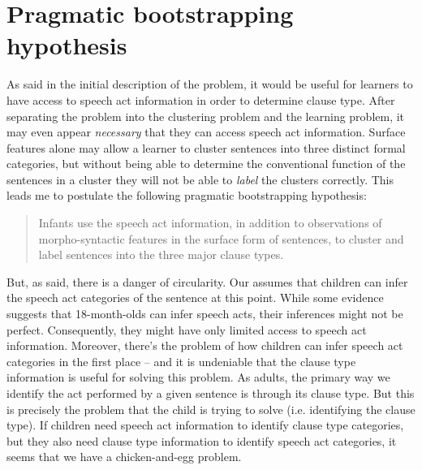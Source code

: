 \section{Pragmatic bootstrapping hypothesis}

As said in the initial description of the problem, it would be useful for learners to have access to speech act information in order to determine clause type. After separating the problem into the clustering problem and the learning problem, it may even appear \emph{necessary} that they can access speech act information. Surface features alone may allow a learner to cluster sentences into three distinct formal categories, but without being able to determine the conventional function of the sentences in a cluster they will not be able to \emph{label} the clusters correctly. This leads me to postulate the following pragmatic bootstrapping hypothesis:

\begin{quote}
Infants use the speech act information, in addition to observations of morpho-syntactic features in the surface form of sentences, to cluster and label sentences into the three major clause types.
\end{quote}



But, as said, there is a danger of circularity.
Our \hypos{} assumes that children can infer the speech act categories of the sentence at this point. While some evidence suggests that 18-month-olds can infer speech acts, their inferences might not be perfect. Consequently, they might have only limited access to speech act information. Moreover, there's the problem of how children can infer speech act categories in the first place -- and it is undeniable that the clause type information is useful for solving this problem. As adults, the primary way we identify the act performed by a given sentence is through its clause type. But this is precisely the problem that the child is trying to solve (i.e. identifying the clause type). If children need speech act information to identify clause type categories, but they also need clause type information to identify speech act categories, it seems that we have a chicken-and-egg problem. 

